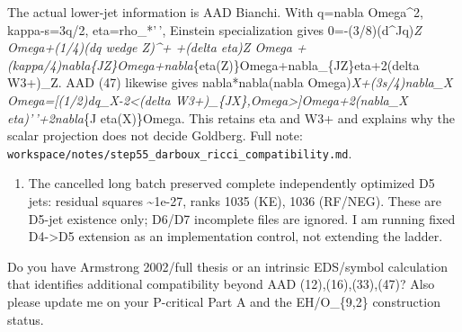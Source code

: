 \documentclass[
  10pt,
]{report}
\providecommand{\tightlist}{%
  \setlength{\itemsep}{0pt}\setlength{\parskip}{0pt}}
\begin{document}
The actual lower-jet information is AAD Bianchi. With q=\textbar nabla
Omega\textbar\^{}2, kappa-s=3q/2, eta=rho\_*'\,', Einstein
specialization gives 0=-(3/8)(d\^{}Jq)\emph{Z Omega+(1/4)(dq wedge
Z)\^{}+ +(delta eta)\emph{Z Omega
+(kappa/4)nabla}\{JZ\}Omega+nabla}\{eta(Z)\}Omega+nabla\_\{JZ\}eta+2(delta
W3+)\_Z. AAD (47) likewise gives nabla*nabla(nabla
Omega)\emph{X+(3s/4)nabla\_X Omega={[}(1/2)dq\_X-2\textless(delta
W3+)\_\{JX\},Omega\textgreater{]}Omega+2(nabla\_X eta)'\,'+2nabla}\{J
eta(X)\}Omega. This retains eta and W3+ and explains why the scalar
projection does not decide Goldberg. Full note:
\texttt{workspace/notes/step55\_darboux\_ricci\_compatibility.md}.

\begin{enumerate}
\def\labelenumi{(\arabic{enumi})}
\setcounter{enumi}{2}
\tightlist
\item
  The cancelled long batch preserved complete independently optimized D5
  jets: residual squares \textasciitilde1e-27, ranks 1035 (KE), 1036
  (RF/NEG). These are D5-jet existence only; D6/D7 incomplete files are
  ignored. I am running fixed D4-\textgreater D5 extension as an
  implementation control, not extending the ladder.
\end{enumerate}

Do you have Armstrong 2002/full thesis or an intrinsic EDS/symbol
calculation that identifies additional compatibility beyond AAD
(12),(16),(33),(47)? Also please update me on your P-critical Part A and
the EH/O\_\{9,2\} construction status.
\end{document}
